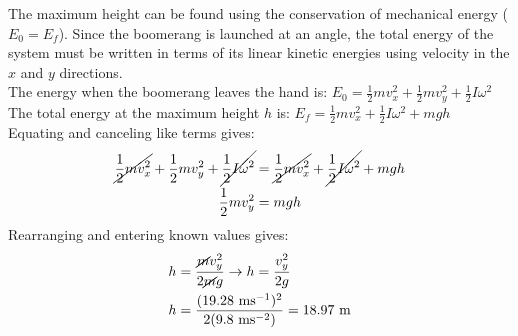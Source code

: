 \documentclass[a4paper]{article}
\newcommand\m{\text{ m}}
\newcommand\ms{\text{ ms}^{-1}}
\newcommand\mss{\text{ ms}^{-2}}
\begin{document}
\begin{shaded}
\begin{enumerate}
        The maximum height can be found using the conservation of mechanical energy ($E_0 = E_f$). Since the boomerang is launched at an angle, the total energy of the system must be written in terms of its linear kinetic energies using velocity in the $x$ and $y$ directions.\\
        The energy when the boomerang leaves the hand is: $\displaystyle E_0 = \frac{1}{2}mv_x^2 + \frac{1}{2}mv_y^2 + \frac{1}{2}I\omega^2$\\
        The total energy at the maximum height $h$ is: $\displaystyle E_f = \frac{1}{2}mv_x^2 + \frac{1}{2}I\omega^2 + mgh$\\
        Equating and canceling like terms gives:
        \begin{align*}
            \cancel{\frac{1}{2}mv_x^2} + \frac{1}{2}mv_y^2 + \cancel{\frac{1}{2}I\omega^2} &= \cancel{\frac{1}{2}mv_x^2} + \cancel{\frac{1}{2}I\omega^2} + mgh\\
            \frac{1}{2}mv_y^2 &= mgh
        \end{align*}
        Rearranging and entering known values gives:
        \begin{align*}
            h &= \frac{\cancel{m}v_y^2}{2\cancel{m}g} \to h = \frac{v_y^2}{2g}\\
            h &= \frac{(19.28\ms)^2}{2(9.8\mss)} = 18.97\m
        \end{align*}
    \end{enumerate} 
\end{shaded}
\end{document}
